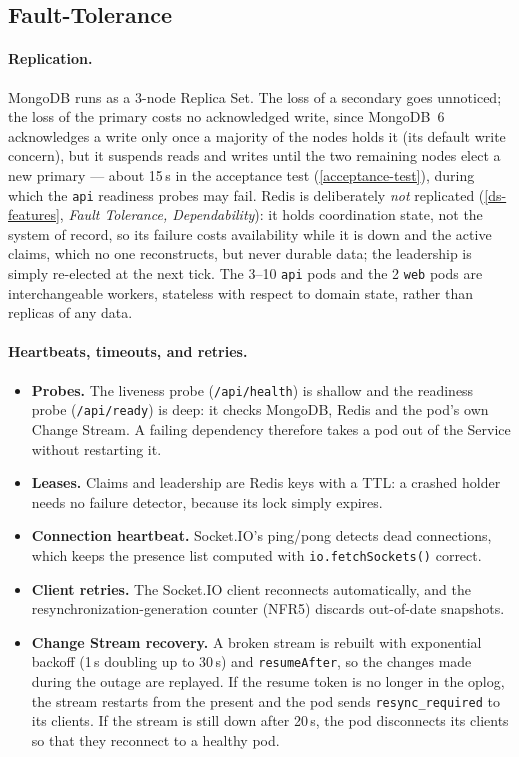 \documentclass{scrartcl}
\begin{document}
\subsection{Fault-Tolerance}\label{fault-tolerance}
 
\paragraph{Replication.} MongoDB runs as a 3-node Replica Set. The loss of a secondary goes unnoticed; the loss of the primary costs no acknowledged write, since MongoDB~6 acknowledges a write only once a majority of the nodes holds it (its default write concern), but it suspends reads and writes until the two remaining nodes elect a new primary --- about 15\,s in the acceptance test (\cref{acceptance-test}), during which the \texttt{api} readiness probes may fail. Redis is deliberately \emph{not} replicated (\cref{ds-features}, \emph{Fault Tolerance, Dependability}): it holds coordination state, not the system of record, so its failure costs availability while it is down and the active claims, which no one reconstructs, but never durable data; the leadership is simply re-elected at the next tick. The 3--10 \texttt{api} pods and the 2 \texttt{web} pods are interchangeable workers, stateless with respect to domain state, rather than replicas of any data.
 
\paragraph{Heartbeats, timeouts, and retries.}
%
\begin{itemize}
  \item \textbf{Probes.} The liveness probe (\texttt{/api/health}) is shallow and the readiness probe (\texttt{/api/ready}) is deep: it checks MongoDB, Redis and the pod's own Change Stream. A failing dependency therefore takes a pod out of the Service without restarting it.
  \item \textbf{Leases.} Claims and leadership are Redis keys with a TTL: a crashed holder needs no failure detector, because its lock simply expires.
  \item \textbf{Connection heartbeat.} Socket.IO's ping/pong detects dead connections, which keeps the presence list computed with \texttt{io.fetchSockets()} correct.
  \item \textbf{Client retries.} The Socket.IO client reconnects automatically, and the resynchronization-generation counter (NFR5) discards out-of-date snapshots.
  \item \textbf{Change Stream recovery.} A broken stream is rebuilt with exponential backoff (1\,s doubling up to 30\,s) and \texttt{resumeAfter}, so the changes made during the outage are replayed. If the resume token is no longer in the oplog, the stream restarts from the present and the pod sends \texttt{resync\_required} to its clients. If the stream is still down after 20\,s, the pod disconnects its clients so that they reconnect to a healthy pod.
\end{itemize}
 
\end{document}
